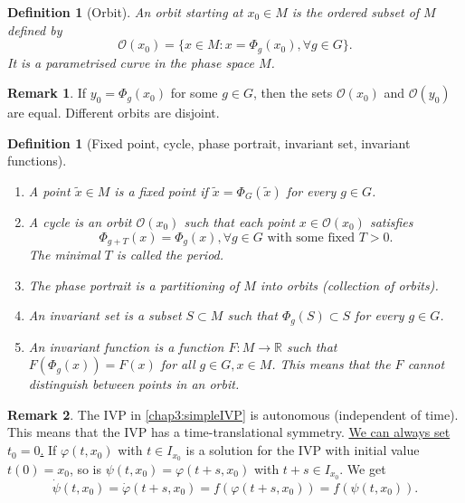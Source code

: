 \documentclass[hidelinks,a4paper, 11pt]{article}
\theoremstyle{plain}
\theoremstyle{break}
\theoremstyle{plain}
\newtheorem{definition}[theorem]{Definition}
\theoremstyle{definition}
\newtheorem*{remark}{Remark}
\begin{document}
\begin{definition}[Orbit]
An \emph{orbit} starting at  $x_0 \in M$ is the ordered subset of $M$ defined by $$\mathcal O(x_0) = \{ x \in M : x = \Phi_g(x_0), \forall g \in G \}.$$ It is a parametrised curve in the phase space $M$.
\end{definition}
\begin{center}
\end{center}

\begin{remark}
	If $y_0 = \Phi_g(x_0)$ for some $g \in G$, then the sets $\mathcal O(x_0)$ and $\mathcal O(y_0)$ are equal. Different orbits are disjoint.
\end{remark}

\begin{definition}[Fixed point, cycle, phase portrait, invariant set, invariant functions]\ { }
	\label{definition:fixedpoint}
	\begin{enumerate}
		\item A point $\tilde x \in M$ is a \emph{fixed point} if $\tilde x = \Phi_G(\tilde x)$ for every $g \in G$.
		
		\item A \emph{cycle} is an orbit $\mathcal O(x_0)$ such that each point $x \in \mathcal O(x_0)$ satisfies
		\[
			\Phi_{g+T}(x) = \Phi_g(x), \forall g \in G \text{ with some fixed } T > 0.
		\]
		The minimal $T$ is called the period.
		
		\item The \emph{phase portrait}  is a partitioning of $M$ into orbits (collection of orbits).
		
		\item An \emph{invariant set} is a subset $S \subset M$ such that $\Phi_g(S) \subset S$ for every $g \in G$.
		
		\item An \emph{invariant function} is a function $F: M \to \mathbb R$ such that $F(\Phi_g(x)) = F(x)$ for all $g \in G, x \in M$. This means that the $F$ cannot distinguish between points in an orbit.
	\end{enumerate}
\end{definition}

\begin{remark}
	The IVP in \eqref{chap3:simpleIVP} is autonomous (independent of time). This means that the IVP has a time-translational symmetry. \underline{We can always set $t_0 = 0$.} If $\varphi(t,x_0)$ with $t \in I_{x_0}$ is a solution for the IVP with initial value $t(0) = x_0$, so is $\psi(t,x_0) = \varphi(t+s,x_0)$ with $t+s \in I_{x_0}$. We get
	\[
		\dot \psi(t,x_0) = \dot \varphi(t+s,x_0) = f(\varphi(t+s,x_0)) = f(\psi(t,x_0)).
	\]
\end{remark}
\end{document}
